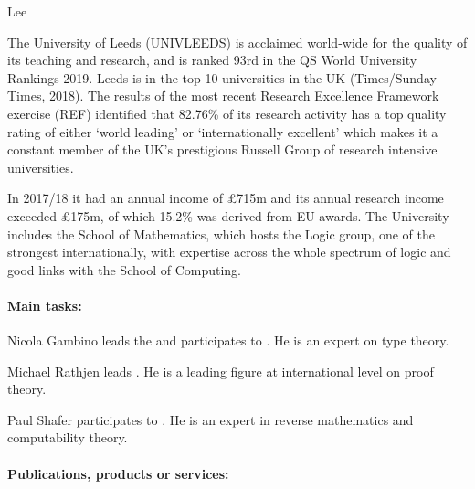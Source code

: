 \begin{sitedescription}{Lee}


The University of Leeds (UNIVLEEDS) is acclaimed world-wide for the quality of its teaching and research, and is ranked 93rd in the QS World University Rankings 2019. Leeds is in the top 10 universities in the UK (Times/Sunday Times, 2018). The results of the most recent Research Excellence Framework exercise (REF) identified that 82.76\% 
of its research activity has a top quality rating of either `world leading' or `internationally excellent' which makes it a constant member of the UK's prestigious Russell Group of research intensive universities. 

In 2017/18 it had an annual income of \pounds 715m and its annual research income exceeded \pounds 175m, of which 15.2\% was derived from EU awards. The University includes the School of Mathematics,
which hosts the Logic group, one of the strongest internationally, with expertise across the whole
spectrum of logic and good links with the School of Computing.




\paragraph*{Main tasks:}

\begin{compactitem}
\item Nicola Gambino leads  the  and participates to . He is an expert on type theory. 
\item Michael Rathjen leads . He is a leading figure at international level
on proof theory. 
\item Paul Shafer participates to  . He is an expert in reverse mathematics
and computability theory.
\end{compactitem}


\paragraph*{Publications, products or services:} 


\end{sitedescription}
